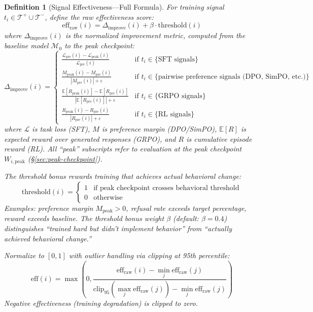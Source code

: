 \documentclass[11pt]{article}
\newtheorem{definition}{Definition}[section]
\begin{document}
\begin{definition}[Signal Effectiveness---Full Formula]
\label{def:signal-effectiveness}
For training signal $t_i \in \mathcal{T}^+ \cup \mathcal{T}^-$, define the raw effectiveness score:
\begin{equation}
\text{eff}_{\text{raw}}(i) = \Delta_{\text{improve}}(i) + \beta \cdot \text{threshold}(i)
\end{equation}
where $\Delta_{\text{improve}}(i)$ is the normalized improvement metric, computed from the baseline model $\mathcal{M}_0$ to the peak checkpoint:
\begin{equation}
\Delta_{\text{improve}}(i) = \begin{cases}
\displaystyle\frac{\mathcal{L}_{\text{pre}}(i) - \mathcal{L}_{\text{peak}}(i)}{\mathcal{L}_{\text{pre}}(i)} & \text{if } t_i \in \{\text{SFT signals}\} \\[1em]
\displaystyle\frac{M_{\text{peak}}(i) - M_{\text{pre}}(i)}{|M_{\text{pre}}(i)| + \varepsilon} & \text{if } t_i \in \{\text{pairwise preference signals (DPO, SimPO, etc.)}\} \\[1em]
\displaystyle\frac{\mathbb{E}[R_{\text{peak}}(i)] - \mathbb{E}[R_{\text{pre}}(i)]}{|\mathbb{E}[R_{\text{pre}}(i)]| + \varepsilon} & \text{if } t_i \in \{\text{GRPO signals}\} \\[1em]
\displaystyle\frac{R_{\text{peak}}(i) - R_{\text{pre}}(i)}{|R_{\text{pre}}(i)| + \varepsilon} & \text{if } t_i \in \{\text{RL signals}\}
\end{cases}
\end{equation}
where $\mathcal{L}$ is task loss (SFT), $M$ is preference margin (DPO/SimPO), $\mathbb{E}[R]$ is expected reward over generated responses (GRPO), and $R$ is cumulative episode reward (RL). All ``peak'' subscripts refer to evaluation at the peak checkpoint $W_{i,\text{peak}}$ (\S\ref{sec:peak-checkpoint}).

The threshold bonus rewards training that achieves actual behavioral change:
\begin{equation}
\text{threshold}(i) = \begin{cases}
1 & \text{if peak checkpoint crosses behavioral threshold} \\
0 & \text{otherwise}
\end{cases}
\end{equation}
Examples: preference margin $M_{\text{peak}} > 0$, refusal rate exceeds target percentage, reward exceeds baseline. The threshold bonus weight $\beta$ (default: $\beta = 0.4$) distinguishes ``trained hard but didn't implement behavior'' from ``actually achieved behavioral change.''

Normalize to $[0,1]$ with outlier handling via clipping at 95th percentile:
\begin{equation}
\text{eff}(i) = \max\left(0, \frac{\text{eff}_{\text{raw}}(i) - \min_j \text{eff}_{\text{raw}}(j)}{\text{clip}_{95}(\max_j \text{eff}_{\text{raw}}(j)) - \min_j \text{eff}_{\text{raw}}(j)}\right)
\end{equation}
Negative effectiveness (training degradation) is clipped to zero.
\end{definition}
\end{document}
